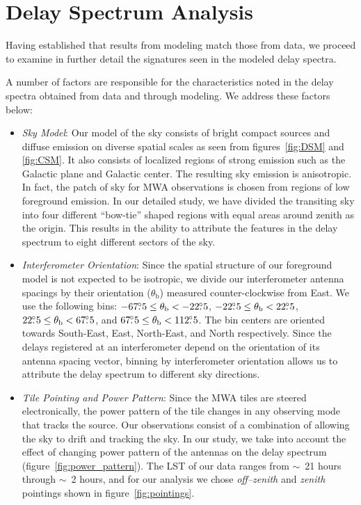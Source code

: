 \documentclass[preprint2,iop,numberedappendix]{emulateapj}
\begin{document}
\section{Delay Spectrum Analysis}\label{sec:delay-spectrum-analysis}

Having established that results from modeling match those from data, we proceed to examine in further detail the signatures seen in the modeled delay spectra. 

A number of factors are responsible for the characteristics noted in the delay spectra obtained from data and through modeling. We address these factors below:
\begin{itemize}

\item {\it Sky Model}: Our model of the sky consists of bright compact sources and diffuse emission on diverse spatial scales as seen from figures~\ref{fig:DSM} and \ref{fig:CSM}. It also consists of localized regions of strong emission such as the Galactic plane and Galactic center. The resulting sky emission is anisotropic. In fact, the patch of sky for MWA observations is chosen from regions of low foreground emission. In our detailed study, we have divided the transiting sky into four different ``bow-tie'' shaped regions with equal areas around zenith as the origin. This results in the ability to attribute the features in the delay spectrum to eight different sectors of the sky. 

\item {\it Interferometer Orientation}: Since the spatial structure of our foreground model is not expected to be isotropic, we divide our interferometer antenna spacings by their orientation ($\theta_\textrm{b}$) measured counter-clockwise from East. We use the following bins: $-67\mbox{$.\!\!^\circ$} 5\le \theta_\textrm{b} < -22\mbox{$.\!\!^\circ$} 5$, $-22\mbox{$.\!\!^\circ$} 5\le \theta_\textrm{b} < 22\mbox{$.\!\!^\circ$} 5$, $22\mbox{$.\!\!^\circ$} 5\le \theta_\textrm{b} < 67\mbox{$.\!\!^\circ$} 5$, and $67\mbox{$.\!\!^\circ$} 5\le \theta_\textrm{b} < 112\mbox{$.\!\!^\circ$} 5$. The bin centers are oriented towards South-East, East, North-East, and North respectively. Since the delays registered at an interferometer depend on the orientation of its antenna spacing vector, binning by interferometer orientation allows us to attribute the delay spectrum to different sky directions.

\item {\it Tile Pointing and Power Pattern}: Since the MWA tiles are steered electronically, the power pattern of the tile changes in any observing mode that tracks the source. Our observations consist of a combination of allowing the sky to drift and tracking the sky. In our study, we take into account the effect of changing power pattern of the antennas on the delay spectrum (figure~\ref{fig:power_pattern}). The LST of our data ranges from $\sim$~21 hours through $\sim$~2 hours, and for our analysis we chose {\it off--zenith} and {\it zenith} pointings shown in figure~\ref{fig:pointings}. 


\end{itemize}
\end{document}
